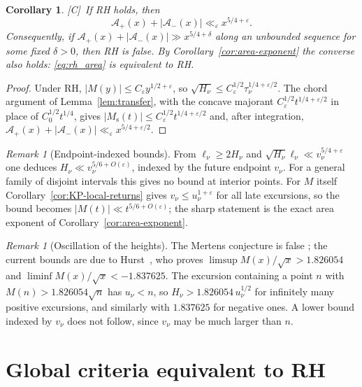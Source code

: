 \documentclass[11pt]{amsart}
\numberwithin{equation}{section}
\theoremstyle{plain}
\newtheorem{corollary}[theorem]{Corollary}
\theoremstyle{definition}
\theoremstyle{remark}
\newtheorem{remark}[theorem]{Remark}
\newcommand{\Ms}{M_{\mathrm{s}}}
\newcommand{\Ap}{\mathcal{A}_{+}}
\newcommand{\Am}{\mathcal{A}_{-}}
\newcommand{\eps}{\varepsilon}
\newcommand{\tagC}{\textup{[C]}}
\begin{document}
\begin{corollary}
\label{cor:rh}
\tagC\ If RH holds, then
\begin{equation}
\label{eq:rh_area}
  \Ap(x)+|\Am(x)|\ll_\eps x^{5/4+\eps}.
\end{equation}
Consequently, if $\Ap(x)+|\Am(x)|\gg x^{5/4+\delta}$ along an unbounded
sequence for some fixed $\delta>0$, then RH is false. By
Corollary~\ref{cor:area-exponent} the converse also holds: \eqref{eq:rh_area}
is equivalent to RH.
\end{corollary}

\begin{proof}
Under RH, $|M(y)|\le C_\eps y^{1/2+\eps}$, so
$\sqrt{H_\nu}\le C_\eps^{1/2}\tau_\nu^{1/4+\eps/2}$. The chord argument of
Lemma~\ref{lem:transfer}, with the concave majorant
$C_\eps^{1/2}t^{1/4+\eps/2}$ in place of $C_0^{1/2}t^{1/4}$, gives
$|\Ms(t)|\le C_\eps^{1/2}t^{1/4+\eps/2}$ and, after integration,
$\Ap(x)+|\Am(x)|\ll_\eps x^{5/4+\eps/2}$.
\end{proof}

\begin{remark}[Endpoint-indexed bounds]
\label{rem:onedirection}
From $\ell_\nu\ge2H_\nu$ and $\sqrt{H_\nu}\ell_\nu\ll v_\nu^{5/4+\eps}$ one
deduces $H_\nu\ll v_\nu^{5/6+O(\eps)}$, indexed by the future endpoint
$v_\nu$. For a general family of disjoint intervals this gives no bound at
interior points. For $M$ itself Corollary~\ref{cor:KP-local-returns} gives
$v_\nu\le u_\nu^{1+\eps}$ for all late excursions, so the bound becomes
$|M(t)|\ll t^{5/6+O(\eps)}$; the sharp statement is the exact area exponent
of Corollary~\ref{cor:area-exponent}.
\end{remark}

\begin{remark}[Oscillation of the heights]
\label{rem:omega}
The Mertens conjecture is false \cite{OdlyzkoTeRiele1985,KotnikTeRiele2006};
the current bounds are due to Hurst~\cite{Hurst18}, who proves
$\limsup M(x)/\sqrt{x}>1.826054$ and
$\liminf M(x)/\sqrt{x}<-1.837625$. The excursion containing a point $n$ with
$M(n)>1.826054\sqrt n$ has $u_\nu<n$, so $H_\nu>1.826054\,u_\nu^{1/2}$ for
infinitely many positive excursions, and similarly with $1.837625$ for
negative ones. A lower bound indexed by $v_\nu$ does not follow, since
$v_\nu$ may be much larger than $n$.
\end{remark}


\section{Global criteria equivalent to RH}
\label{sec:criteria}
\end{document}
